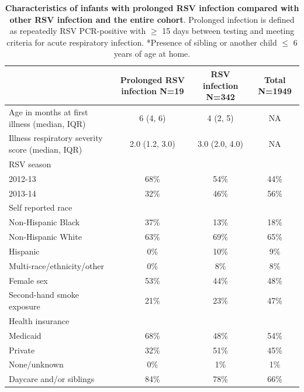 \documentclass{article} %
\begin{document}
\begin{landscape}										
\begin{table}[ht]										
\centering										
\begin{tabular}{ l c c c }
\toprule
 & \textbf{Prolonged RSV infection N=19} & \textbf{RSV infection N=342} & \textbf{Total N=1949}\\
\hline
Age in months at first illness (median, IQR) & 6 (4, 6)  & 4 (2, 5) & NA\\
\hline
Illness respiratory severity score (median, IQR) & 2.0 (1.2, 3.0) & 3.0 (2.0, 4.0) & NA \\
\hline
RSV season  & & & \\
\hspace{1em} 2012-13 & 68\% & 54\% & 44\%\\
\hspace{1em} 2013-14 & 32\% & 46\% & 56\%\\
\hline
Self reported race & & & \\
\hspace{1em} Non-Hispanic Black & 37\% & 13\% & 18\%\\
\hspace{1em} Non-Hispanic White & 63\% & 69\% & 65\%\\
\hspace{1em} Hispanic & 0\% & 10\% & 9\%\\
\hspace{1em} Multi-race/ethnicity/other  & 0\% & 8\% & 8\%\\
\hline
Female sex & 53\% & 44\% & 48\%\\
\hline
Second-hand smoke exposure & 21\% & 23\% & 47\%\\
\hline
Health insurance  & & & \\
\hspace{1em} Medicaid & 68\% & 48\% & 54\%\\
\hspace{1em} Private & 32\% & 51\% & 45\%\\
\hspace{1em} None/unknown & 0\% & 1\% & 1\%\\
\hline
Daycare and/or siblings & 84\% & 78\% & 66\%\\
\bottomrule	
									
\end{tabular}	

\caption{										
\textbf{Characteristics of infants with prolonged RSV infection compared with other RSV infection and the entire cohort}. Prolonged infection is defined as repeatedly RSV PCR-positive with $\ge$ 15 days between testing and meeting criteria for acute respiratory infection. *Presence of sibling or another child $\le$ 6 years of age at home.}										
\label{tab:1}							
\end{table}										
\end{landscape}		
\clearpage		
\end{document}
